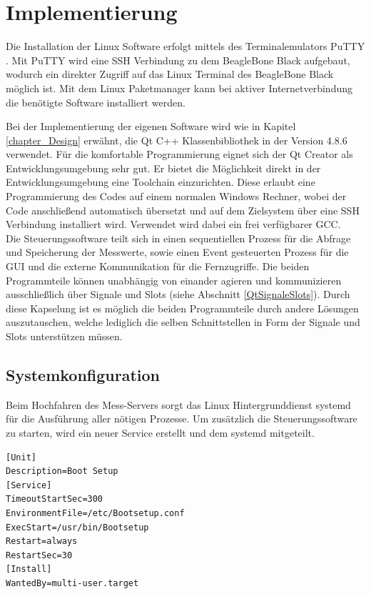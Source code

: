 \chapter{Implementierung}
\label{chapter_Implementierung}



Die Installation der Linux Software erfolgt mittels des Terminalemulators PuTTY \cite{putty}. Mit \mbox{PuTTY} wird eine \ac{SSH} Verbindung zu dem BeagleBone Black aufgebaut, wodurch ein direkter Zugriff auf das Linux Terminal des BeagleBone Black möglich ist. Mit dem Linux Paketmanager kann bei aktiver Internetverbindung die benötigte Software installiert werden.\ 

Bei der Implementierung der eigenen Software wird wie in Kapitel \ref{chapter_Design} erwähnt, die Qt C++ Klassenbibliothek in der Version 4.8.6 verwendet. Für die komfortable Programmierung eignet sich der Qt Creator als Entwicklungsumgebung sehr gut. Er bietet die Möglichkeit direkt in der Entwicklungsumgebung eine Toolchain einzurichten. Diese erlaubt eine Programmierung des Codes auf einem normalen Windows Rechner, wobei der Code anschließend automatisch übersetzt und auf dem Zielsystem über eine \ac{SSH} Verbindung installiert wird. Verwendet wird dabei ein frei verfügbarer \ac{GCC}.\\
Die Steuerungssoftware teilt sich in einen sequentiellen Prozess für die Abfrage und Speicherung der Messwerte, sowie einen Event gesteuerten Prozess für die \ac{GUI} und die externe Kommunikation für die Fernzugriffe. 
Die beiden Programmteile können unabhängig von einander agieren und kommunizieren ausschließlich über Signale und Slots (siehe Abschnitt \ref{QtSignaleSlots}). Durch diese Kapselung ist es möglich die beiden Programmteile durch andere Lösungen auszutauschen, welche lediglich die selben Schnittstellen in Form der Signale und Slots unterstützen müssen.

\section{Systemkonfiguration}

Beim Hochfahren des Mess-Servers sorgt das Linux Hintergrunddienst systemd für die Ausführung aller nötigen Prozesse. Um zusätzlich die Steuerungssoftware zu starten, wird ein neuer Service erstellt und dem systemd mitgeteilt.\\
\newpage
\begin{lstlisting}[caption={Systemd Service},label=lst_SystemdService]
[Unit]
Description=Boot Setup
[Service]
TimeoutStartSec=300
EnvironmentFile=/etc/Bootsetup.conf
ExecStart=/usr/bin/Bootsetup
Restart=always
RestartSec=30
[Install]
WantedBy=multi-user.target
\end{lstlisting}

